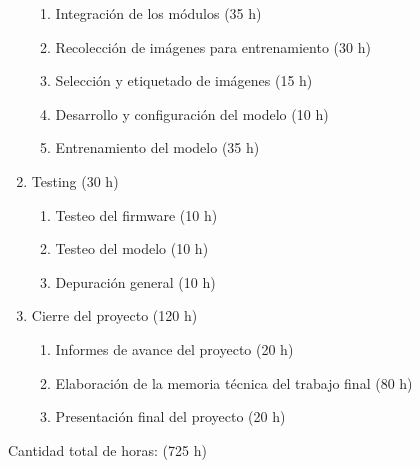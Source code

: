 \documentclass[
11pt, %
]{charter}
\begin{document}
\begin{enumerate}
\begin{enumerate}
	\item Integración de los módulos (35 h)
    \item Recolección de imágenes para entrenamiento (30 h)
	\item Selección y etiquetado de imágenes (15 h)
    \item Desarrollo y configuración del modelo (10 h)
	\item Entrenamiento del modelo (35 h)
	\end{enumerate}
 \item Testing (30 h)
	\begin{enumerate}
	\item Testeo del firmware (10 h)
	\item Testeo del modelo (10 h)
	\item Depuración general (10 h)
	\end{enumerate}
 \item Cierre del proyecto (120 h)
	\begin{enumerate}
	\item Informes de avance del proyecto (20 h)
	\item Elaboración de la memoria técnica del trabajo final (80 h)
	\item Presentación final del proyecto (20 h)
	\end{enumerate}
\end{enumerate}

Cantidad total de horas: (725 h)
\end{document}
